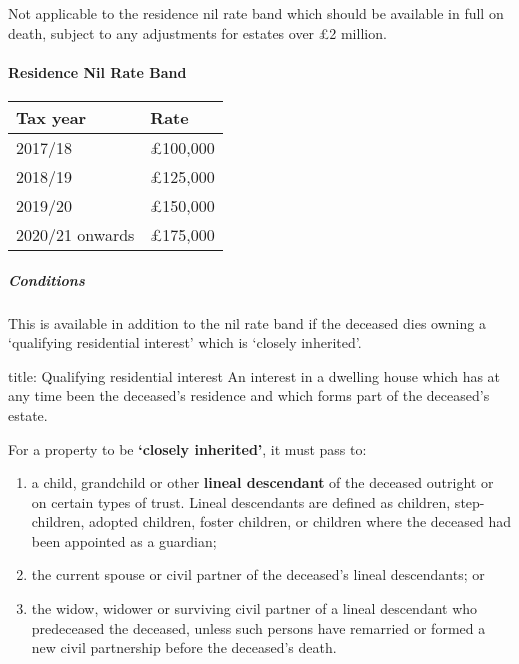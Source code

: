 \documentclass[
]{article}
\newenvironment{Shaded}{}{}
\newcommand{\NormalTok}[1]{#1}
\providecommand{\tightlist}{%
  \setlength{\itemsep}{0pt}\setlength{\parskip}{0pt}}
\begin{document}
Not applicable to the residence nil rate band which should be available
in full on death, subject to any adjustments for estates over £2
million.

\hypertarget{residence-nil-rate-band}{%
\paragraph{Residence Nil Rate Band}\label{residence-nil-rate-band}}

\begin{longtable}[]{@{}ll@{}}
\toprule()
Tax year & Rate \\
\midrule()
\endhead
2017/18 & £100,000 \\
2018/19 & £125,000 \\
2019/20 & £150,000 \\
2020/21 onwards & £175,000 \\
\bottomrule()
\end{longtable}

\hypertarget{conditions}{%
\subparagraph{Conditions}\label{conditions}}

This is available in addition to the nil rate band if the deceased dies
owning a `qualifying residential interest' which is `closely inherited'.

\begin{Shaded}
\begin{Highlighting}[]
\NormalTok{title: Qualifying residential interest}
\NormalTok{An interest in a dwelling house which has at any time been the deceased’s residence and which forms part of the deceased’s estate.}
\end{Highlighting}
\end{Shaded}

For a property to be \textbf{`closely inherited'}, it must pass to:

\begin{enumerate}
\def\labelenumi{\arabic{enumi}.}
\tightlist
\item
  a child, grandchild or other \textbf{lineal descendant} of the
  deceased outright or on certain types of trust. Lineal descendants are
  defined as children, step-children, adopted children, foster children,
  or children where the deceased had been appointed as a guardian;
\item
  the current spouse or civil partner of the deceased's lineal
  descendants; or
\item
  the widow, widower or surviving civil partner of a lineal descendant
  who predeceased the deceased, unless such persons have remarried or
  formed a new civil partnership before the deceased's death.
\end{enumerate}
\end{document}
